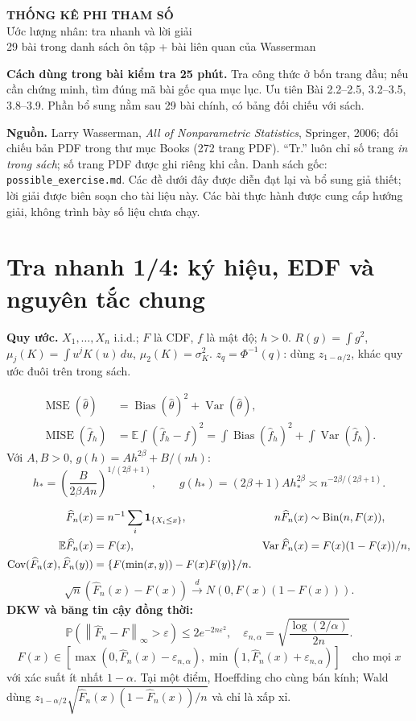 \documentclass[11pt,a4paper]{article}
\newcommand{\E}{\mathbb E}\newcommand{\Pp}{\mathbb P}
\DeclareMathOperator{\Var}{Var}\DeclareMathOperator{\Cov}{Cov}
\DeclareMathOperator{\Bias}{Bias}\DeclareMathOperator{\MSE}{MSE}
\DeclareMathOperator{\MISE}{MISE}\DeclareMathOperator{\AMISE}{AMISE}
\newcommand{\Fh}{\widehat F_n}\newcommand{\fh}{\widehat f_h}
\newcommand{\dto}{\xrightarrow{d}}\newcommand{\pto}{\xrightarrow{P}}
\newcommand{\norm}[1]{\left\lVert#1\right\rVert}
\begin{document}
\begin{center}
{\LARGE\bfseries THỐNG KÊ PHI THAM SỐ}\\[5pt]
{\Large Ước lượng nhân: tra nhanh và lời giải}\\[5pt]
{\normalsize 29 bài trong danh sách ôn tập + bài liên quan của Wasserman}
\end{center}
\textbf{Cách dùng trong bài kiểm tra 25 phút.} Tra công thức ở bốn trang đầu; nếu cần chứng minh, tìm đúng mã bài gốc qua mục lục. Ưu tiên Bài 2.2--2.5, 3.2--3.5, 3.8--3.9. Phần bổ sung nằm sau 29 bài chính, có bảng đối chiếu với sách.

\textbf{Nguồn.} Larry Wasserman, \emph{All of Nonparametric Statistics}, Springer, 2006; đối chiếu bản PDF trong thư mục Books (272 trang PDF). ``Tr.'' luôn chỉ số trang \emph{in trong sách}; số trang PDF được ghi riêng khi cần. Danh sách gốc: \texttt{possible\_exercise.md}. Các đề dưới đây được diễn đạt lại và bổ sung giả thiết; lời giải được biên soạn cho tài liệu này. Các bài thực hành được cung cấp hướng giải, không trình bày số liệu chưa chạy.

\section*{Tra nhanh 1/4: ký hiệu, EDF và nguyên tắc chung}
\textbf{Quy ước.} $X_1,\ldots,X_n$ i.i.d.; $F$ là CDF, $f$ là mật độ; $h>0$.
$R(g)=\int g^2$, $\mu_j(K)=\int u^jK(u)\,du$, $\mu_2(K)=\sigma_K^2$.
$z_q=\Phi^{-1}(q)$: dùng $z_{1-\alpha/2}$, khác quy ước đuôi trên trong sách.
\begin{result}
\begin{align*}
\MSE(\widehat\theta)&=\Bias(\widehat\theta)^2+\Var(\widehat\theta),\\
\MISE(\fh)&=\E\int(\fh-f)^2=\int\Bias(\fh)^2+\int\Var(\fh).
\end{align*}
Với $A,B>0$, $g(h)=Ah^{2\beta}+B/(nh)$:
\[
h_* =\left(\frac{B}{2\beta An}\right)^{1/(2\beta+1)},\qquad
g(h_*)=(2\beta+1)A h_*^{2\beta}\asymp n^{-2\beta/(2\beta+1)}.
\]
\end{result}
\begin{align*}
\Fh(x)&=n^{-1}\sum_i\1_{\{X_i\le x\}},& n\Fh(x)&\sim\operatorname{Bin}(n,F(x)),\\
\E\Fh(x)&=F(x),&\Var\Fh(x)&=F(x)(1-F(x))/n,\\
\Cov(\Fh(x),\Fh(y))&=\{F(\min(x,y))-F(x)F(y)\}/n.
\end{align*}
\[
\sqrt n(\Fh(x)-F(x))\dto N(0,F(x)(1-F(x))).
\]
\textbf{DKW và băng tin cậy đồng thời:}
\[
\Pp(\norm{\Fh-F}_\infty>\varepsilon)\le2e^{-2n\varepsilon^2},\quad
\varepsilon_{n,\alpha}=\sqrt{\frac{\log(2/\alpha)}{2n}}.
\]
\[
F(x)\in[\max(0,\Fh(x)-\varepsilon_{n,\alpha}),\min(1,\Fh(x)+\varepsilon_{n,\alpha})]
\quad\text{cho mọi }x
\]
với xác suất ít nhất $1-\alpha$. Tại một điểm, Hoeffding cho cùng bán kính; Wald dùng
$z_{1-\alpha/2}\sqrt{\Fh(x)(1-\Fh(x))/n}$ và chỉ là xấp xỉ.
\end{document}
